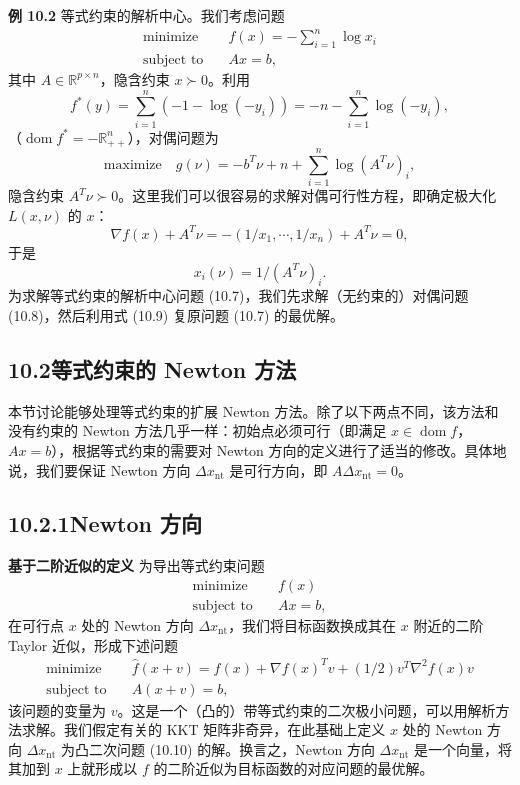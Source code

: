 \documentclass[UTF8,12pt,a4paper,fontset=fandol]{ctexart}
\begin{document}
\noindent\textbf{例 10.2}\quad
等式约束的解析中心。我们考虑问题
\begin{equation}
\begin{aligned}
\text{minimize}\quad & f(x)=-\sum_{i=1}^n\log x_i\\
\text{subject to}\quad & Ax=b,
\end{aligned}
\tag{10.7}
\end{equation}
其中 $A\in\mathbb{R}^{p\times n}$，隐含约束 $x\succ 0$。利用
\[
f^\ast(y)=\sum_{i=1}^n(-1-\log(-y_i))=-n-\sum_{i=1}^n\log(-y_i),
\]
（$\operatorname{dom} f^\ast=-\mathbb{R}_{++}^n$），对偶问题为
\begin{equation}
\text{maximize}\quad g(\nu)=-b^T\nu+n+\sum_{i=1}^n\log(A^T\nu)_i,
\tag{10.8}
\end{equation}
隐含约束 $A^T\nu\succ 0$。这里我们可以很容易的求解对偶可行性方程，即确定极大化 $L(x,\nu)$ 的 $x$：
\[
\nabla f(x)+A^T\nu=-(1/x_1,\cdots,1/x_n)+A^T\nu=0,
\]
于是
\begin{equation}
x_i(\nu)=1/(A^T\nu)_i.
\tag{10.9}
\end{equation}
为求解等式约束的解析中心问题 (10.7)，我们先求解（无约束的）对偶问题 (10.8)，然后利用式 (10.9) 复原问题 (10.7) 的最优解。

\subsection*{10.2\quad 等式约束的 Newton 方法}

本节讨论能够处理等式约束的扩展 Newton 方法。除了以下两点不同，该方法和没有约束的 Newton 方法几乎一样：初始点必须可行（即满足 $x\in\operatorname{dom} f$，$Ax=b$），根据等式约束的需要对 Newton 方向的定义进行了适当的修改。具体地说，我们要保证 Newton 方向 $\Delta x_{\mathrm{nt}}$ 是可行方向，即 $A\Delta x_{\mathrm{nt}}=0$。

\subsection*{10.2.1\quad Newton 方向}

\noindent\textbf{基于二阶近似的定义}\quad
为导出等式约束问题
\[
\begin{aligned}
\text{minimize}\quad & f(x)\\
\text{subject to}\quad & Ax=b,
\end{aligned}
\]
在可行点 $x$ 处的 Newton 方向 $\Delta x_{\mathrm{nt}}$，我们将目标函数换成其在 $x$ 附近的二阶 Taylor 近似，形成下述问题
\begin{equation}
\begin{aligned}
\text{minimize}\quad & \hat{f}(x+v)=f(x)+\nabla f(x)^Tv+(1/2)v^T\nabla^2 f(x)v\\
\text{subject to}\quad & A(x+v)=b,
\end{aligned}
\tag{10.10}
\end{equation}
该问题的变量为 $v$。这是一个（凸的）带等式约束的二次极小问题，可以用解析方法求解。我们假定有关的 KKT 矩阵非奇异，在此基础上定义 $x$ 处的 Newton 方向 $\Delta x_{\mathrm{nt}}$ 为凸二次问题 (10.10) 的解。换言之，Newton 方向 $\Delta x_{\mathrm{nt}}$ 是一个向量，将其加到 $x$ 上就形成以 $f$ 的二阶近似为目标函数的对应问题的最优解。
\end{document}
